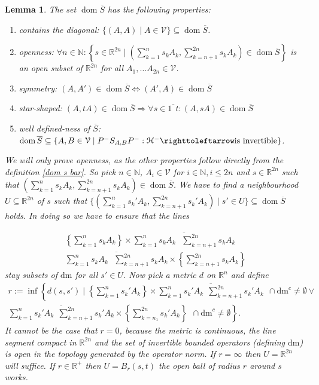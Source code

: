 \documentclass[b5paper,draft,openbib,12pt]{memoir}
\newtheorem{Lemma}[Def]{Lemma}
\DeclareMathOperator{\dom}{dom}
\begin{document}
\begin{Lemma}
The set \(\dom \overline{S}\) has the following properties:
\begin{enumerate}
\item contains the diagonal: \(\{(A,A)\mid A\in\mathcal{V}\}\subseteq \dom\overline{S}\).
\item openness: \(\forall n \in \mathbb{N}: \left\{s\in\mathbb{R}^{2n}\mid \left(\sum_{k=1}^n s_k A_k,\sum_{k=n+1}^{2n} s_{k} A_{k} \right)\in \dom\overline{S}\right\}\) is an open subset of \(\mathbb{R}^{2n}\) for all \(A_1,\dots A_{2n}\in\mathcal{V}\).
\item symmetry:  \((A,A')\in\dom\overline{S}\iff (A',A)\in\dom\overline{S}\)
\item star-shaped: \((A,t A)\in \dom\overline{S}\Rightarrow \forall s\in \overline{1~~t} : (A,s A)\in\dom\overline{S}\)
\item well defined-ness of \(\overline{S}\): \(\dom\overline{S}\subseteq \{A,B\in\mathcal{V}\mid P^- S_{A,B} P^-:\mathcal{H}^- \righttoleftarrow \text{is invertible} \}\).
\end{enumerate}
We will only prove openness, as the other properties follow directly from the definition \eqref{dom s bar}. So pick \(n\in\mathbb{N}\), 
\(A_i\in\mathcal{V}\) for \(i\in \mathbb{N}, i\le 2 n\) and \(s\in\mathbb{R}^{2n}\)
such that \(\left(\sum_{k=1}^n s_k A_k,\sum_{k=n+1}^{2n} s_{k} A_{k} \right)\in\dom\overline{S}\). 
We have to find a neighbourhood \(U\subseteq \mathbb{R}^{2n}\) of \(s\) such that 
\(\{ \left(\sum_{k=1}^n s_k' A_k,\sum_{k=n+1}^{2n} s_{k}' A_{k} \right) \mid s'\in U\}\subseteq \dom\overline{S}\) holds. 
In doing so we have to ensure that the lines 

\begin{align}
\left\{\sum_{k=1}^n s_k A_k\right\} \times \overline{\sum_{k=1}^n s_k A_k~~~\sum_{k=n+1}^{2n} s_{k} A_{k} }\\
\overline{\sum_{k=1}^n s_k A_k~~~\sum_{k=n+1}^{2n} s_{k} A_{k}} \times \left\{\sum_{k=n+1}^{2n} s_{k} A_{k}\right\} 
\end{align}
stay subsets of \(\mathrm{dm}\) for all \(s'\in U\). Now pick a metric \(d\) on \(\mathbb{R}^n\) and define 
\begin{align}\nonumber
r:=\inf \left\{d(s,s')\mid  \left\{\sum_{k=1}^n s_k' A_k\right\}\times \overline{\sum_{k=1}^n s_k' A_k~~\sum_{k=n+1}^{2n} s_k' A_k } ~~\cap \mathrm{dm}^c\neq \emptyset \vee\right.\\
 \left. \overline{\sum_{k=1}^n s_k' A_k~~\sum_{k=n+1}^{2n} s_k' A_k }\times \left\{\sum_{k=n_1}^{2n} s_k' A_k \right\}~~\cap \mathrm{dm}^c\neq \emptyset  \right\}.
\end{align}
It cannot be the case that \(r=0\), because the metric is continuous, the line segment compact in \(\mathbb{R}^{2n}\) 
and the set of invertible bounded operators (defining \(\mathrm{dm}\)) is open in the topology generated by the operator norm.
If \(r=\infty\) then \(U=\mathbb{R}^{2n}\) will suffice. If \(r\in\mathbb{R}^+\) then \(U=B_r(s,t)\) the open ball of radius \(r\) around \(s\) works.
\end{Lemma}
\end{document}
